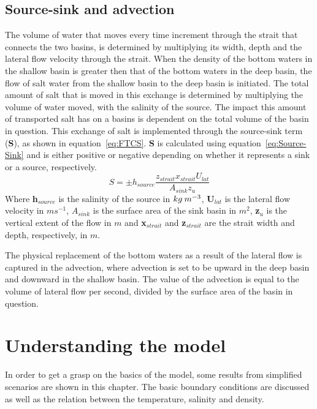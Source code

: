 \documentclass[twocolumn]{article}
\begin{document}
\subsection{Source-sink and advection}
The volume of water that moves every time increment through the strait that connects the two basins, is determined by multiplying its width, depth and the lateral flow velocity through the strait. When the density of the bottom waters in the shallow basin is greater then that of the bottom waters in the deep basin, the flow of salt water from the shallow basin to the deep basin is initiated. The total amount of salt that is moved in this exchange is determined by multiplying the volume of water moved, with the salinity of the source. The impact this amount of transported salt has on a basins is dependent on the total volume of the basin in question. This exchange of salt is implemented through the source-sink term (\textbf{S}), as shown in equation~\ref{eq:FTCS}. \textbf{S} is calculated using equation~\ref{eq:Source-Sink} and is either positive or negative depending on whether it represents a sink or a source, respectively.
\begin{equation}
    S = \pm h_{source} \frac{ z_{strait} x_{strait} U_{lat} }{A_{sink} z_u} 
    \label{eq:Source-Sink}
\end{equation}
Where \textbf{h}$_{source}$ is the salinity of the source in $kg \hspace{0.8mm} m^{-3}$, \textbf{U}$_{lat}$ is the lateral flow velocity in $ms^{-1}$, $A_{sink}$ is the surface area of the sink basin in $m^2$, \textbf{z}$_u$ is the vertical extent of the flow in $m$ and \textbf{x}$_{strait}$ and \textbf{z}$_{strait}$ are the strait width and depth, respectively, in $m$.

The physical replacement of the bottom waters as a result of the lateral flow is captured in the advection, where advection is set to be upward in the deep basin and downward in the shallow basin. The value of the advection is equal to the volume of lateral flow per second, divided by the surface area of the basin in question. 



\section{Understanding the model}
In order to get a grasp on the basics of the model, some results from simplified scenarios are shown in this chapter. The basic boundary conditions are discussed as well as the relation between the temperature, salinity and density.
\end{document}
